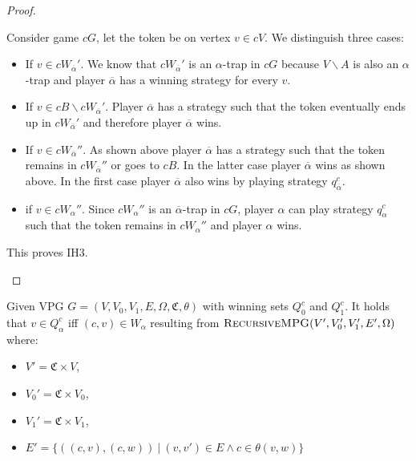 \begin{theorem}
\begin{proof}
\begin{itemize}
			Consider game $cG$, let the token be on vertex $v \in cV$. We distinguish three cases:
			\begin{itemize}
				\item If $v \in cW_{\overline{\alpha}}'$. We know that $cW_{\overline{\alpha}}'$ is an $\alpha$-trap in $cG$ because $V\backslash A$ is also an $\alpha$-trap and player $\overline{\alpha}$ has a winning strategy for every $v$.
				\item If $v \in cB \backslash cW_{\overline{\alpha}}'$. Player $\overline{\alpha}$ has a strategy such that the token eventually ends up in $cW_{\overline{\alpha}}'$ and therefore player $\overline{\alpha}$ wins.
				\item If $v \in cW_{\overline{\alpha}}''$. As shown above player $\overline{\alpha}$ has a strategy such that the token remains in $cW_{\overline{\alpha}}''$ or goes to $cB$. In the latter case player $\overline{\alpha}$ wins as shown above. In the first case player $\overline{\alpha}$ also wins by playing strategy $q_{\overline{\alpha}}^c$.
				\item if $v \in cW_\alpha''$. Since $cW_\alpha''$ is an $\overline{\alpha}$-trap in $cG$, player $\alpha$ can play strategy $q_\alpha^c$ such that the token remains in $cW_\alpha''$ and player $\alpha$ wins.
			\end{itemize}
		This proves IH3.
		\end{itemize}
	
	\end{proof}
\end{theorem}
\begin{theorem}
	Given VPG $G = (V,V_0,V_1,E,\Omega,\mathfrak{C},\theta)$ with winning sets $Q_0^c$ and $Q_1^c$. It holds that $v \in Q_\alpha^c$ iff $(c,v) \in W_\alpha$ resulting from $\textsc{RecursiveMPG}(V',V_0',V_1',E',\Omega)$ where:
	\begin{itemize}
		\item $V' = \mathfrak{C} \times V$,
		\item $V_0' = \mathfrak{C} \times V_0$,
		\item $V_1' = \mathfrak{C} \times V_1$,
		\item $E' = \{ ((c,v),(c,w))\ |\ (v,v') \in E \wedge c \in\theta(v,w) \}$
	\end{itemize}
\end{theorem}
